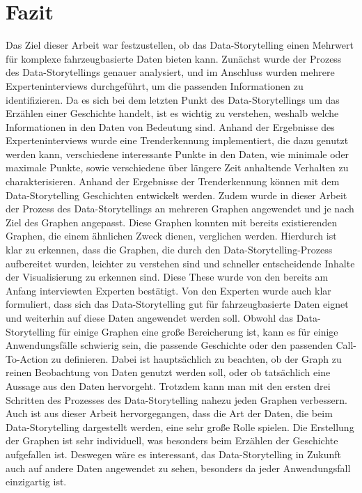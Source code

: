 \section{Fazit}
Das Ziel dieser Arbeit war festzustellen, ob das Data-Storytelling einen Mehrwert für komplexe fahrzeugbasierte Daten bieten kann.
Zunächst wurde der Prozess des Data-Storytellings genauer analysiert, und im Anschluss wurden mehrere Experteninterviews durchgeführt, um die passenden Informationen zu identifizieren. Da es sich bei dem letzten Punkt des Data-Storytellings um das Erzählen einer Geschichte handelt, ist es wichtig zu verstehen, weshalb welche Informationen in den Daten von Bedeutung sind. Anhand der Ergebnisse des Experteninterviews wurde eine Trenderkennung implementiert, die dazu genutzt werden kann, verschiedene interessante Punkte in den Daten, wie minimale oder maximale Punkte, sowie verschiedene über längere Zeit anhaltende Verhalten zu charakterisieren. Anhand der Ergebnisse der Trenderkennung können mit dem Data-Storytelling Geschichten entwickelt werden. Zudem wurde in dieser Arbeit der Prozess des Data-Storytellings an mehreren Graphen angewendet und je nach Ziel des Graphen angepasst. Diese Graphen konnten mit bereits existierenden Graphen, die einem ähnlichen Zweck dienen, verglichen werden. Hierdurch ist klar zu erkennen, dass die Graphen, die durch den Data-Storytelling-Prozess aufbereitet wurden, leichter zu verstehen sind und schneller entscheidende Inhalte der Visualisierung zu erkennen sind. Diese These wurde von den bereits am Anfang interviewten Experten bestätigt. Von den Experten wurde auch klar formuliert, dass sich das Data-Storytelling gut für fahrzeugbasierte Daten eignet und weiterhin auf diese Daten angewendet werden soll. Obwohl das Data-Storytelling für einige Graphen eine große Bereicherung ist, kann es für einige Anwendungsfälle schwierig sein, die passende Geschichte oder den passenden Call-To-Action zu definieren. Dabei ist hauptsächlich zu beachten, ob der Graph zu reinen Beobachtung von Daten genutzt werden soll, oder ob tatsächlich eine Aussage aus den Daten hervorgeht. Trotzdem kann man mit den ersten drei Schritten des Prozesses des Data-Storytelling nahezu jeden Graphen verbessern. Auch ist aus dieser Arbeit hervorgegangen, dass die Art der Daten, die beim Data-Storytelling dargestellt werden, eine sehr große Rolle spielen. Die Erstellung der Graphen ist sehr individuell, was besonders beim Erzählen der Geschichte aufgefallen ist. Deswegen wäre es interessant, das Data-Storytelling in Zukunft auch auf andere Daten angewendet zu sehen, besonders da jeder Anwendungsfall einzigartig ist. 